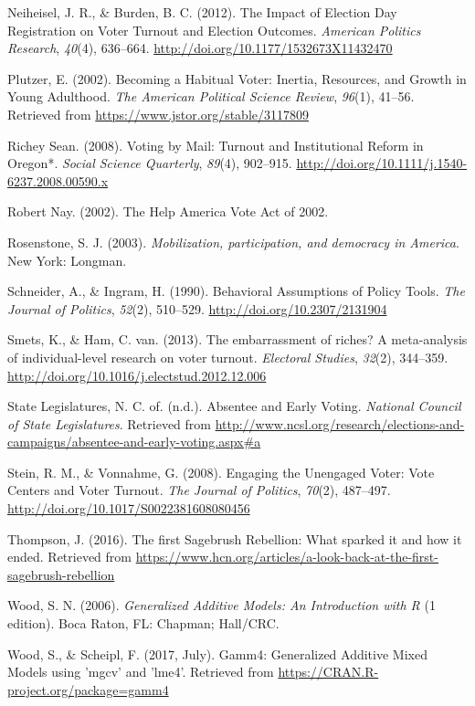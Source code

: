 \documentclass[12pt,twoside]{reedthesis}
\begin{document}
  \hypertarget{ref-neiheisel_impact_2012}{}
  Neiheisel, J. R., \& Burden, B. C. (2012). The Impact of Election Day
  Registration on Voter Turnout and Election Outcomes. \emph{American
  Politics Research}, \emph{40}(4), 636--664.
  \url{http://doi.org/10.1177/1532673X11432470}
  
  \hypertarget{ref-plutzer_becoming_2002}{}
  Plutzer, E. (2002). Becoming a Habitual Voter: Inertia, Resources, and
  Growth in Young Adulthood. \emph{The American Political Science Review},
  \emph{96}(1), 41--56. Retrieved from
  \url{https://www.jstor.org/stable/3117809}
  
  \hypertarget{ref-richey_sean_voting_2008}{}
  Richey Sean. (2008). Voting by Mail: Turnout and Institutional Reform in
  Oregon*. \emph{Social Science Quarterly}, \emph{89}(4), 902--915.
  \url{http://doi.org/10.1111/j.1540-6237.2008.00590.x}
  
  \hypertarget{ref-robert_nay_help_2002}{}
  Robert Nay. (2002). The Help America Vote Act of 2002.
  
  \hypertarget{ref-rosenstone_mobilization_2003}{}
  Rosenstone, S. J. (2003). \emph{Mobilization, participation, and
  democracy in America}. New York: Longman.
  
  \hypertarget{ref-schneider_behavioral_1990}{}
  Schneider, A., \& Ingram, H. (1990). Behavioral Assumptions of Policy
  Tools. \emph{The Journal of Politics}, \emph{52}(2), 510--529.
  \url{http://doi.org/10.2307/2131904}
  
  \hypertarget{ref-smets_embarrassment_2013}{}
  Smets, K., \& Ham, C. van. (2013). The embarrassment of riches? A
  meta-analysis of individual-level research on voter turnout.
  \emph{Electoral Studies}, \emph{32}(2), 344--359.
  \url{http://doi.org/10.1016/j.electstud.2012.12.006}
  
  \hypertarget{ref-national_council_of_state_legislatures_absentee_nodate}{}
  State Legislatures, N. C. of. (n.d.). Absentee and Early Voting.
  \emph{National Council of State Legislatures}. Retrieved from
  \url{http://www.ncsl.org/research/elections-and-campaigns/absentee-and-early-voting.aspx\#a}
  
  \hypertarget{ref-stein_engaging_2008}{}
  Stein, R. M., \& Vonnahme, G. (2008). Engaging the Unengaged Voter: Vote
  Centers and Voter Turnout. \emph{The Journal of Politics}, \emph{70}(2),
  487--497. \url{http://doi.org/10.1017/S0022381608080456}
  
  \hypertarget{ref-thompson_first_2016}{}
  Thompson, J. (2016). The first Sagebrush Rebellion: What sparked it and
  how it ended. Retrieved from
  \url{https://www.hcn.org/articles/a-look-back-at-the-first-sagebrush-rebellion}
  
  \hypertarget{ref-wood_generalized_2006}{}
  Wood, S. N. (2006). \emph{Generalized Additive Models: An Introduction
  with R} (1 edition). Boca Raton, FL: Chapman; Hall/CRC.
  
  \hypertarget{ref-wood_gamm4:_2017}{}
  Wood, S., \& Scheipl, F. (2017, July). Gamm4: Generalized Additive Mixed
  Models using 'mgcv' and 'lme4'. Retrieved from
  \url{https://CRAN.R-project.org/package=gamm4}


\end{document}
